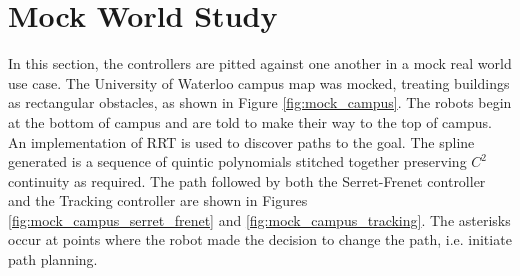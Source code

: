 \section{Mock World Study}
In this section, the controllers are pitted against one another in a mock real world use case. The University of Waterloo campus map was mocked, treating buildings as rectangular obstacles, as shown in Figure \ref{fig:mock_campus}. The robots begin at the bottom of campus and are told to make their way to the top of campus. An implementation of RRT is used to discover paths to the goal. The spline generated is a sequence of quintic polynomials stitched together preserving $C^2$ continuity as required. The path followed by both the Serret-Frenet controller and the Tracking controller are shown in Figures \ref{fig:mock_campus_serret_frenet} and \ref{fig:mock_campus_tracking}. The asterisks occur at points where the robot made the decision to change the path, i.e. initiate path planning.

